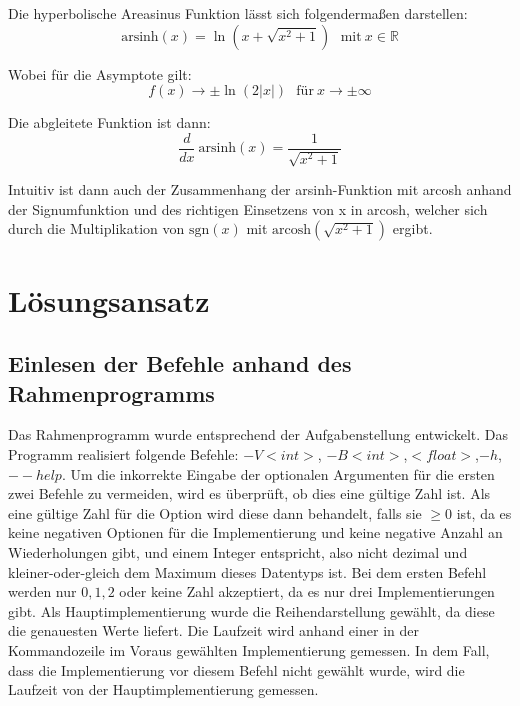 \documentclass[course=erap]{aspdoc}
\begin{document}
Die hyperbolische Areasinus Funktion lässt sich folgendermaßen darstellen: 
\begin{equation}\label{func}
    \text{arsinh}(x) = \ln(x + \sqrt{x^2 + 1}) \ \ \ \text{mit} \ x \in \mathbb{R}
\end{equation}

Wobei für die Asymptote gilt:
\begin{equation}\label{asympt}
    f(x) \rightarrow \pm \ln(2|x|) \ \ \ \text{für} \ x \rightarrow \pm \infty
\end{equation}

Die abgleitete Funktion ist dann:
\begin{equation}\label{ableit}
    \frac{d}{dx} \ \text{arsinh}(x) = \frac{1}{\sqrt{x^2 + 1}}
\end{equation}

Intuitiv ist dann auch der Zusammenhang der arsinh-Funktion mit arcosh anhand der Signumfunktion und des richtigen Einsetzens von x in arcosh, welcher sich durch die Multiplikation von $\text{sgn}(x)$ mit $\text{arcosh}(\sqrt{x^2 + 1})$ ergibt.
 \section{Lösungsansatz}
 \subsection{Einlesen der Befehle anhand des Rahmenprogramms}
 
     Das Rahmenprogramm wurde entsprechend der Aufgabenstellung entwickelt. Das Programm realisiert folgende Befehle: $-V<int> $, $-B<int>$,$<float>$,$-h$,$--help$. Um die inkorrekte Eingabe der optionalen Argumenten für die ersten zwei Befehle zu vermeiden, wird es überprüft, ob dies eine gültige Zahl ist. Als eine gültige Zahl für die Option wird diese dann behandelt, falls sie $\geq 0$ ist, da es keine negativen Optionen für die Implementierung und keine negative Anzahl an Wiederholungen gibt, und einem Integer entspricht, also nicht dezimal und kleiner-oder-gleich dem Maximum dieses Datentyps ist. Bei dem ersten Befehl werden nur $0,1,2$ oder keine Zahl akzeptiert, da es nur drei Implementierungen gibt. Als Hauptimplementierung wurde die Reihendarstellung gewählt, da diese die genauesten Werte liefert. Die Laufzeit wird anhand einer in der Kommandozeile im Voraus gewählten Implementierung gemessen. In dem Fall, dass die Implementierung vor diesem Befehl nicht gewählt wurde, wird die Laufzeit von der Hauptimplementierung gemessen. 
     
\end{document}
